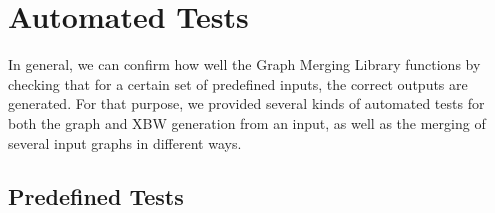 \documentclass[a4paper,12pt,twoside,BCOR=10mm]{scrbook}
\begin{document}
\section{Automated Tests}
%

In general, we can confirm how well the Graph Merging Library functions by checking 
that for a certain set of predefined inputs, the correct outputs are generated. 
For that purpose, we provided several kinds of automated tests for both the 
graph and XBW generation from an input, as well as the merging of several input graphs 
in different ways.

\subsection{Predefined Tests}
\end{document}
